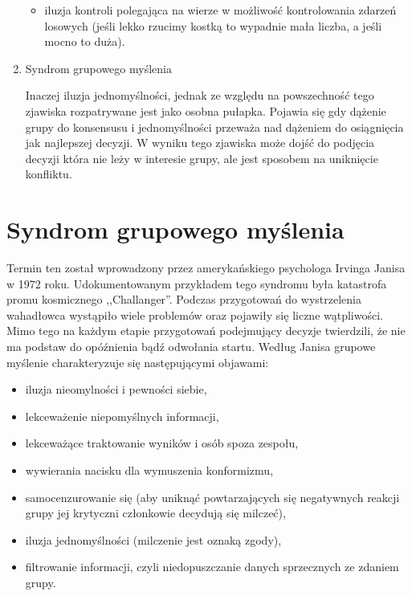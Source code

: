 \begin{enumerate}
\begin{itemize}
    \item iluzja kontroli polegająca na wierze w możliwość kontrolowania zdarzeń
    losowych (jeśli lekko rzucimy kostką to wypadnie mała liczba, a jeśli mocno
    to duża).
  \end{itemize}
  
  \item Syndrom grupowego myślenia \cite{Whyte1989}
  
  Inaczej iluzja jednomyślności, jednak ze względu na powszechność tego zjawiska
  rozpatrywane jest jako osobna pułapka. Pojawia się gdy dążenie grupy do 
  konsensusu i jednomyślności przeważa nad dążeniem do osiągnięcia jak 
  najlepszej decyzji. W wyniku tego zjawiska może dojść do podjęcia decyzji 
  która nie leży w interesie grupy, ale jest sposobem na uniknięcie konfliktu.

\end{enumerate}

\section{Syndrom grupowego myślenia}
Termin ten został wprowadzony przez amerykańskiego psychologa Irvinga Janisa w
1972 roku. Udokumentowanym przykładem tego syndromu była katastrofa promu
kosmicznego ,,Challanger''. Podczas przygotowań do wystrzelenia wahadłowca
wystąpiło wiele problemów oraz pojawiły się liczne wątpliwości. Mimo tego na
każdym  etapie przygotowań podejmujący decyzje twierdzili, że nie ma podstaw do 
opóźnienia bądź odwołania startu.
Według Janisa \cite{Janis1972} grupowe myślenie charakteryzuje się następującymi
objawami:

\begin{itemize}
  \item iluzja nieomylności i pewności siebie,
  \item lekceważenie niepomyślnych informacji,
  \item lekceważące traktowanie wyników i osób spoza zespołu,
  \item wywierania nacisku dla wymuszenia konformizmu,
  \item samocenzurowanie się (aby uniknąć powtarzających się negatywnych reakcji
  grupy jej krytyczni członkowie decydują się milczeć),
  \item iluzja jednomyślności (milczenie jest oznaką zgody),
  \item filtrowanie informacji, czyli niedopuszczanie danych sprzecznych ze
  zdaniem grupy.
\end{itemize}


